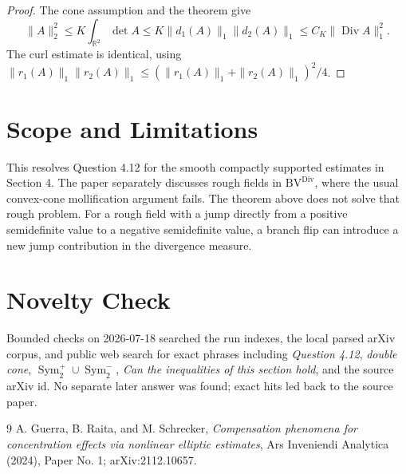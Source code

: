 \documentclass[11pt]{article}
\newcommand{\R}{\mathbb R}
\newcommand{\Sym}{\operatorname{Sym}}
\newcommand{\Div}{\operatorname{Div}}
\begin{document}
\begin{proof}
The cone assumption and the theorem give
\[
  \|A\|_2^2
  \leq
  K\int_{\R^2}\det A
  \leq
  K\|d_1(A)\|_1\|d_2(A)\|_1
  \leq
  C_K\|\Div A\|_1^2 .
\]
The curl estimate is identical, using
\(\|r_1(A)\|_1\|r_2(A)\|_1
\leq(\|r_1(A)\|_1+\|r_2(A)\|_1)^2/4\).
\end{proof}

\section*{Scope and Limitations}

This resolves Question 4.12 for the smooth compactly supported estimates in
Section 4. The paper separately discusses rough fields in
\(\mathrm{BV}^{\Div}\), where the usual convex-cone mollification argument
fails. The theorem above does not solve that rough problem. For a rough field
with a jump directly from a positive semidefinite value to a negative
semidefinite value, a branch flip can introduce a new jump contribution in the
divergence measure.

\section*{Novelty Check}

Bounded checks on 2026-07-18 searched the run indexes, the local parsed arXiv
corpus, and public web search for exact phrases including
\emph{Question 4.12}, \emph{double cone}, \(\Sym_2^+\cup\Sym_2^-\),
\emph{Can the inequalities of this section hold}, and the source arXiv id.
No separate later answer was found; exact hits led back to the source paper.

\begin{thebibliography}{9}
A. Guerra, B. Raita, and M. Schrecker,
\emph{Compensation phenomena for concentration effects via nonlinear elliptic
estimates}, Ars Inveniendi Analytica (2024), Paper No. 1; arXiv:2112.10657.
\end{thebibliography}
\end{document}

